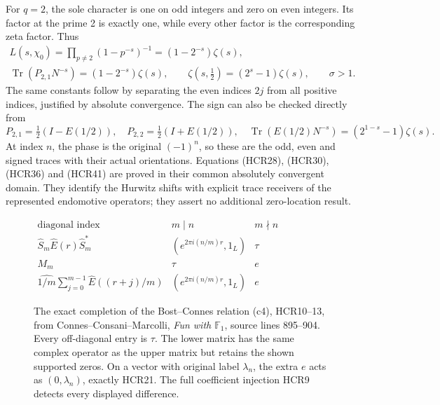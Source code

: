 For $q=2$, the sole character is one on odd integers
and zero on even integers. Its factor at the prime
2 is exactly one, while every other factor is the
corresponding zeta factor. Thus
\begin{equation}\tag{HCR41}
\boxed{\begin{gathered}
 L(s,\chi_0)=\prod_{p\ne2}(1-p^{-s})^{-1}
                           =(1-2^{-s})\zeta(s),\\
 \operatorname{Tr}(P_{2,1}N^{-s})=(1-2^{-s})\zeta(s),\qquad
 \zeta(s,\tfrac12)=(2^s-1)\zeta(s),\qquad\sigma>1.
\end{gathered}}
\end{equation}
The same constants follow by separating the even
indices $2j$ from all positive indices, justified
by absolute convergence. The sign can also be
checked directly from
\begin{equation}\tag{HCR42}
 P_{2,1}=\tfrac12(I-E(1/2)),\quad
 P_{2,2}=\tfrac12(I+E(1/2)),\quad
 \operatorname{Tr}(E(1/2)N^{-s})=(2^{1-s}-1)\zeta(s).
\end{equation}
At index $n$, the phase is the original $(-1)^n$,
so these are the odd, even and signed traces with
their actual orientations. Equations (HCR28),
(HCR30), (HCR36) and (HCR41) are proved in their
common absolutely convergent domain. They identify
the Hurwitz shifts with explicit trace receivers
of the represented endomotive operators; they
assert no additional zero-location result.

\begin{figure}[htbp]
\centering
$\begin{array}{c|cc}
 \text{diagonal index}&m\mid n&m\nmid n\\\hline
 \widehat S_m\widehat E(r)\widehat S_m^*
   &(e^{2\pi i(n/m)r},1_L)&\tau\\
 M_m&\tau&e\\\hline
 \widehat{1/m}\sum_{j=0}^{m-1}\widehat E((r+j)/m)
   &(e^{2\pi i(n/m)r},1_L)&e
 \end{array}$
\caption{The exact completion of the Bost--Connes relation
(c4), HCR10--13, from Connes--Consani--Marcolli,
\emph{Fun with $\mathbb F_1$}, source lines 895--904.
Every off-diagonal entry is $\tau$. The lower matrix
has the same complex operator as the upper matrix
but retains the shown supported zeros. On a vector
with original label $\lambda_n$, the extra $e$ acts
as $(0,\lambda_n)$, exactly HCR21. The full
coefficient injection HCR9 detects every displayed
difference.}
\end{figure}
